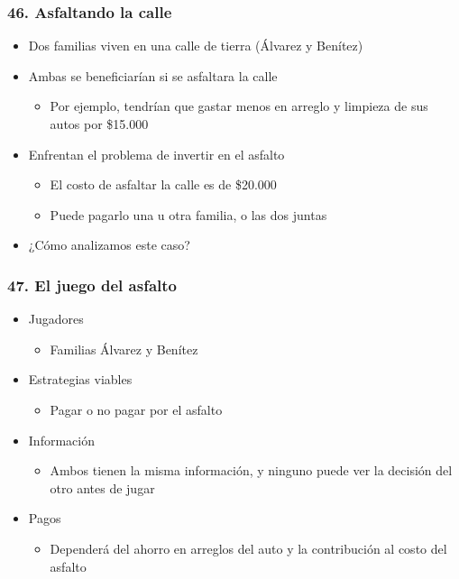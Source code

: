 \documentclass[14pt]{beamer}
\begin{document}
\begin{frame}
\frametitle{46. Asfaltando la calle}
\begin{itemize}
    \item Dos familias viven en una calle de tierra (Álvarez y Benítez)
    \item Ambas se beneficiarían si se asfaltara la calle
        \begin{itemize}
        \item Por ejemplo, tendrían que gastar menos en arreglo y limpieza de sus autos por \$15.000
        \end{itemize}
    \item Enfrentan el problema de invertir en el asfalto
        \begin{itemize}
        \item El costo de asfaltar la calle es de \$20.000
        \item Puede pagarlo una u otra familia, o las dos juntas
        \end{itemize}
\item ¿Cómo analizamos este caso?
\end{itemize}
\end{frame}

\begin{frame}
\frametitle{47. El juego del asfalto}
\begin{itemize}
    \item Jugadores
        \begin{itemize}
        \item Familias Álvarez y Benítez
        \end{itemize}
    \item Estrategias viables
        \begin{itemize}
        \item Pagar o no pagar por el asfalto
        \end{itemize}
    \item Información
        \begin{itemize}
        \item Ambos tienen la misma información, y ninguno puede ver la decisión del otro antes de jugar
        \end{itemize}
    \item Pagos
        \begin{itemize}
        \item Dependerá del ahorro en arreglos del auto y la contribución al costo del asfalto
        \end{itemize}
\end{itemize}
\end{frame}
\end{document}
